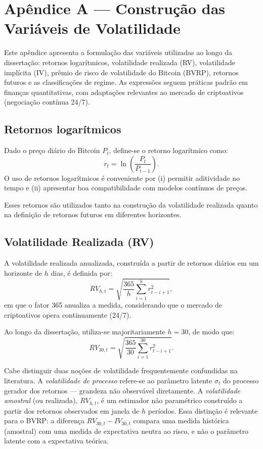 \chapter{Apêndice A — Construção das Variáveis de Volatilidade}
\label{apendiceA}

Este apêndice apresenta a formulação das variáveis utilizadas ao longo da
dissertação: retornos logarítmicos, volatilidade realizada (RV), volatilidade
implícita (IV), prêmio de risco de volatilidade do Bitcoin (BVRP), retornos
futuros e as classificações de regime. As expressões seguem práticas
padrão em finanças quantitativas, com adaptações relevantes ao mercado de
criptoativos (negociação contínua 24/7).

\section{Retornos logarítmicos}

Dado o preço diário do Bitcoin $P_t$, define-se o retorno logarítmico como:
\[
r_t = \ln\left(\frac{P_t}{P_{t-1}}\right).
\]
O uso de retornos logarítmicos é conveniente por (i) permitir aditividade no
tempo e (ii) apresentar boa compatibilidade com modelos contínuos de preços.

Esses retornos são utilizados tanto na construção da volatilidade realizada
quanto na definição de retornos futuros em diferentes horizontes.

\section{Volatilidade Realizada (RV)}

A volatilidade realizada anualizada, construída a partir de retornos diários em
um horizonte de $h$ dias, é definida por:
\[
RV_{h,t} = \sqrt{\frac{365}{h}\sum_{i=1}^{h} r_{t-i+1}^{2}},
\]
em que o fator 365 anualiza a medida, considerando que o mercado de criptoativos
opera continuamente (24/7).

Ao longo da dissertação, utiliza-se majoritariamente $h=30$, de modo que:
\[
RV_{30,t} = \sqrt{\frac{365}{30}\sum_{i=1}^{30} r_{t-i+1}^{2}}.
\]

Cabe distinguir duas noções de volatilidade frequentemente confundidas na literatura. A \textit{volatilidade de processo} refere-se ao parâmetro latente $\sigma_t$ do processo gerador dos retornos --- grandeza não observável diretamente. A \textit{volatilidade amostral} (ou realizada), $RV_{h,t}$, é um estimador não paramétrico construído a partir dos retornos observados em janela de $h$ períodos. Essa distinção é relevante para o BVRP: a diferença $RV_{30,t} - IV_{30,t}$ compara uma medida histórica (amostral) com uma medida de expectativa neutra ao risco, e não o parâmetro latente com a expectativa teórica.

